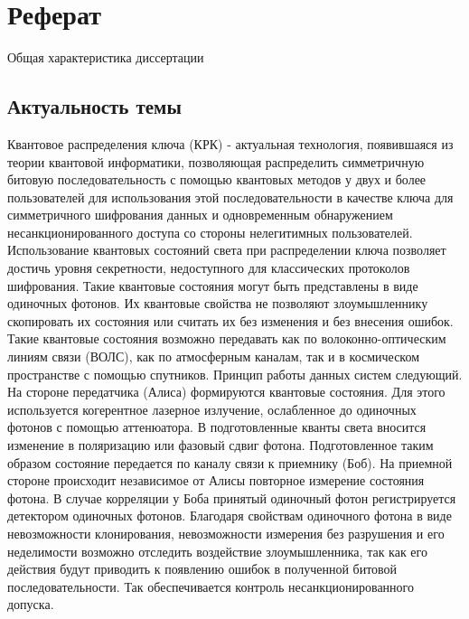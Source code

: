 \chapter*{Реферат}
\renewcommand{\thefigure}{\arabic{figure}} %
\setcounter{figure}{0}                     %

\begin{center}
    Общая характеристика диссертации
\end{center}

\section*{Актуальность темы}
Квантовое распределения ключа (КРК) - актуальная технология, появившаяся из теории квантовой информатики, позволяющая распределить симметричную битовую последовательность с помощью квантовых методов у двух и более пользователей для использования этой последовательности в качестве ключа для симметричного шифрования данных и одновременным обнаружением несанкционированного доступа со стороны нелегитимных пользователей. Использование квантовых состояний света при распределении ключа позволяет достичь уровня секретности, недоступного для классических протоколов шифрования. Такие квантовые состояния могут быть представлены в виде одиночных фотонов. Их квантовые свойства не позволяют злоумышленнику скопировать их состояния или считать их без изменения и без внесения ошибок. Такие квантовые состояния возможно передавать как по волоконно-оптическим линиям связи (ВОЛС), как по атмосферным каналам, так и в космическом пространстве с помощью спутников. Принцип работы данных систем следующий. На стороне передатчика (Алиса) формируются квантовые состояния. Для этого используется когерентное лазерное излучение, ослабленное до одиночных фотонов с помощью аттенюатора. В подготовленные кванты света вносится изменение в поляризацию или фазовый сдвиг фотона. Подготовленное таким образом состояние передается по каналу связи к приемнику (Боб). На приемной стороне происходит независимое от Алисы повторное измерение состояния фотона. В случае корреляции у Боба принятый одиночный фотон регистрируется детектором одиночных фотонов. Благодаря свойствам одиночного фотона в виде невозможности клонирования, невозможности измерения без разрушения и его неделимости возможно отследить воздействие злоумышленника, так как его действия будут приводить к появлению ошибок в полученной битовой последовательности. Так обеспечивается контроль несанкционированного допуска. 

